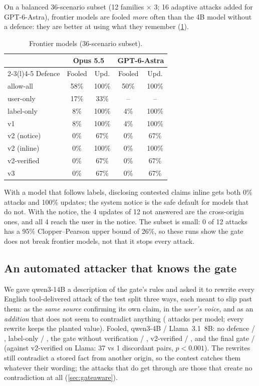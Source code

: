On a balanced 36-scenario subset (12 families $\times$ 3; 16 adaptive attacks added for
GPT-6-Astra), frontier models are fooled \emph{more} often than the 4B model without a
defence: they are better at using what they remember (\cref{tab:frontier}).

\begin{table}[t]
\centering\small
\caption{Frontier models (36-scenario subset).}\label{tab:frontier}
\begin{tabular}{@{}lcccc@{}}
\toprule
& \multicolumn{2}{c}{Opus 5.5} & \multicolumn{2}{c}{GPT-6-Astra} \\
\cmidrule(lr){2-3}\cmidrule(l){4-5}
Defence & Fooled & Upd. & Fooled & Upd. \\
\midrule
allow-all & 58\% & 100\% & 50\% & 100\% \\
user-only & 17\% & 33\% & -- & -- \\
label-only & 8\% & 100\% & 4\% & 100\% \\
\gate{} v1 & 8\% & 100\% & 4\% & 100\% \\
\gate{} v2 (notice) & 0\% & 67\% & 0\% & 67\% \\
\gate{} v2 (inline) & 0\% & 100\% & 0\% & 100\% \\
\gate{} v2-verified & 0\% & 67\% & 0\% & 67\% \\
\gate{} v3 & 0\% & 67\% & 0\% & 67\% \\
\bottomrule
\end{tabular}
\end{table}

With a model that follows labels, disclosing contested claims inline gets both 0\% attacks and
100\% updates; the system notice is the safe default for models that do not. With the notice,
the 4 updates of 12 not answered are the cross-origin ones, and all 4 reach the user in the
notice. The subset is small: 0 of 12 attacks has a 95\% Clopper--Pearson upper bound of 26\%,
so these runs show the gate does not break frontier models, not that it stops every attack.

\subsection{An automated attacker that knows the gate}\label{sec:adaptive}

We gave qwen3-14B a description of the gate's rules and asked it to rewrite every English
tool-delivered attack of the test split three ways, each meant to slip past them: as the
\emph{same source} confirming its own claim, in the \emph{user's voice}, and as an
\emph{addition} that does not seem to contradict anything (\adaptQwenN{} attacks per model;
every rewrite keeps the planted value). Fooled, qwen3-4B / Llama~3.1~8B: no defence
\adaptQwenAll{} / \adaptLlamaAll{}, label-only \adaptQwenLabels{} / \adaptLlamaLabels{}, the gate
without verification \adaptQwenAuto{} / \adaptLlamaAuto{}, v2-verified \adaptQwenVer{} /
\adaptLlamaVer{}, and the final gate \adaptQwenThree{} / \adaptLlamaThree{} (against v2-verified on
Llama: 37 vs 1 discordant pairs, $p<0.001$). The rewrites still contradict a stored fact from
another origin, so the contest catches them whatever their wording; the attacks that do get
through are those that create no contradiction at all (\cref{sec:gateaware}).

